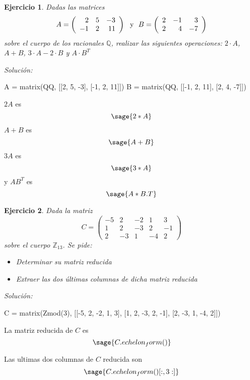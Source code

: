 \documentclass{amsart}
\newtheorem{ejer}{Ejercicio}
\def\z{\mathbb{Z}}
\def\q{\mathbb{Q}}
\begin{document}
\begin{ejer}
Dadas las matrices 
\[ A =
	\left( \begin{array}{rrr}
		2 & 5 & -3 \\
		-1 & 2 & 11
	\end{array}
	\right) \ \ \hbox{y} \ \   B =
	\left( \begin{array}{rrr}
		2 & -1 & 3 \\
		2 & 4 & -7
	\end{array}
	\right) 
	\]
sobre el cuerpo de los racionales $\q$, realizar las siguientes operaciones: $2\cdot A$, $A+B$, $3\cdot A -2\cdot B$ y $A\cdot B^T$

\end{ejer}
{\it Soluci\'on:}

\begin{sageblock}
	A = matrix(QQ, [[2, 5, -3], [-1, 2, 11]])
	B = matrix(QQ, [[-1, 2, 11], [2, 4, -7]])
\end{sageblock}

$2 A$ es $$\sage{2 * A}$$ $A + B$ es $$\sage{A + B}$$ $3 A$ es $$\sage{3 * A}$$ y $A B^T$ es $$\sage{A * B.T}$$


\begin{ejer}
Dada la matriz 
\[ C =
	\left( \begin{array}{rrrrr}
		-5 & 2 & -2  & 1 & 3 \\
		1 & 2 & -3 & 2 & -1 \\ 
		2 & -3 & 1 & -4 & 2
	\end{array}
	\right) \]
sobre el cuerpo $\z _{13}$. Se pide:
\begin{itemize}
\item Determinar su matriz reducida
\item Extraer las dos últimas columnas de dicha matriz reducida
\end{itemize}	
\end{ejer}
{\it Soluci\'on:}

\begin{sageblock}
	C = matrix(Zmod(3), [[-5, 2, -2, 1, 3], [1, 2, -3, 2, -1], [2, -3, 1, -4, 2]])
\end{sageblock}

La matriz reducida de $C$ es $$\sage{C.echelon_form()}$$

Las ultimas dos columnas de $C$ reducida son $$\sage{C.echelon_form()[:, 3:]}$$

\end{document}
